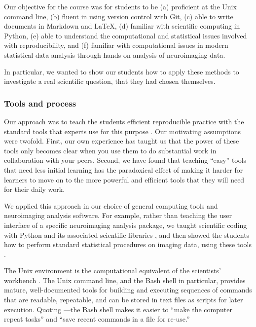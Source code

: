 Our objective for the course was for students to be
(a) proficient at the Unix command line,
(b) fluent in using version control with Git,
(c) able to write documents in Markdown and \LaTeX,
(d) familiar with scientific computing in Python,
(e) able to understand the computational and statistical issues involved with
reproducibility, and
(f) familiar with computational issues in modern statistical data
analysis through hands-on analysis of neuroimaging data.

In particular, we wanted to show our students how to apply these methods to
investigate a real scientific question, that they had chosen themselves.

\subsubsection{Tools and process}

Our approach was to teach the students efficient reproducible practice with
the standard tools that experts use for this purpose
\citep{millman2014developing}. Our motivating assumptions were twofold.
First, our own experience has taught us that the power of these tools only
becomes clear when you use them to do substantial work in collaboration with
your peers.  Second, we have found that teaching ``easy'' tools that need less
initial learning has the paradoxical effect of making it harder for learners
to move on to the more powerful and efficient tools that they will need for
their daily work.

We applied this approach in our choice of general computing tools and
neuroimaging analysis software.   For example, rather than teaching the user
interface of a specific neuroimaging analysis package, we taught scientific
coding with Python and its associated scientific libraries
\citep{millman2011python, perez2011python}, and then showed the students how to
perform standard statistical procedures on imaging data, using these tools
\citep{millman2007analysis}.

The Unix environment is the computational equivalent of the scientists'
workbench \citep{preeyanon2014reproducible}.  The Unix command line, and the
Bash shell in particular, provides mature, well-documented tools for building
and executing sequences of commands that are readable, repeatable, and can be
stored in text files as scripts for later execution.  Quoting
\cite{wilson2014best}---the Bash shell makes it easier to ``make the computer
repeat tasks'' and ``save recent commands in a file for re-use.''

